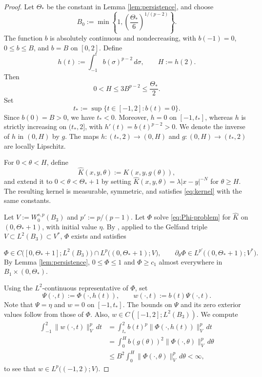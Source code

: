 \documentclass[10pt]{amsart}
\theoremstyle{plain}
\theoremstyle{definition}
\theoremstyle{remark}
\numberwithin{equation}{section}
\begin{document}
\begin{proof}
Let $\Theta_*$ be the constant in Lemma \ref{lem:persistence}, and choose
\[
B_0:=\min\left\{1,\left(\frac{\Theta_*}{6}\right)^{1/(p-2)}\right\}.
\]
The function $b$ is absolutely continuous and nondecreasing, with
$b(-1)=0$, $0\le b\le B$, and $b=B$ on $[0,2]$. Define
\begin{equation}\label{eq:bump-clock}
h(t):=\int_{-1}^t b(\sigma)^{p-2}\,d\sigma,
\qquad H:=h(2).
\end{equation}
Then
\begin{equation}\label{eq:bump-clock-bound}
0<H\le3B^{p-2}\le\frac{\Theta_*}{2}.
\end{equation}
Set
\[
t_*:=\sup\{t\in[-1,2]:b(t)=0\}.
\]
Since $b(0)=B>0$, we have $t_*<0$. Moreover, $h=0$ on
$[-1,t_*]$, whereas $h$ is strictly increasing on $(t_*,2]$, with
$h'(t)=b(t)^{p-2}>0$. We denote the inverse of $h$ in $(0,H)$ by $g$.
The maps $h:(t_*,2)\to(0,H)$ and
$g:(0,H)\to(t_*,2)$ are locally Lipschitz.

For $0<\theta<H$, define
\[
\widehat K(x,y,\theta):=K(x,y,g(\theta)),
\]
and extend it to $0<\theta<\Theta_*+1$ by setting
$\widehat K(x,y,\theta)=\lambda|x-y|^{-N}$ for $\theta\ge H$.
The resulting kernel is measurable, symmetric, and satisfies
\eqref{eq:kernel} with the same constants. 

Let $V:=W^{s,p}_0(B_3)$ and $p':=p/(p-1)$. Let $\Phi$ solve
\eqref{eq:Phi-problem} for $\widehat K$ on $(0,\Theta_*+1)$, with
initial value $\eta$. By \cite[Theorem~1.3 and
Proposition~2.23(ii)]{KaltenbachRuzicka}, applied to the Gelfand triple
$V\subset L^2(B_3)\subset V^*$, $\Phi$ exists and satisfies

\[
\Phi\in C\bigl([0,\Theta_*+1];L^2(B_3)\bigr)
\cap L^p\bigl((0,\Theta_*+1);V\bigr),
\qquad
\partial_\theta\Phi\in L^{p'}\bigl((0,\Theta_*+1);V^*\bigr).
\]
By Lemma \ref{lem:persistence}, $0\le\Phi\le1$ and
$\Phi\ge c_1$ almost everywhere in $B_1\times(0,\Theta_*)$.

Using the $L^2$-continuous representative of $\Phi$, set
\[
\Psi(\cdot,t):=\Phi(\cdot,h(t)),
\qquad w(\cdot,t):=b(t)\Psi(\cdot,t).
\]
Note that $\Psi=\eta$ and $w=0$ on $[-1,t_*]$. The bounds on
$\Psi$ and its zero exterior values follow from those of $\Phi$.
Also, $w\in C([-1,2];L^2(B_3))$. We compute
\begin{align*}
\int_{-1}^2\|w(\cdot,t)\|_V^p\,dt
&=\int_{t_*}^2 b(t)^p\|\Phi(\cdot,h(t))\|_V^p\,dt\\
&=\int_0^H b(g(\theta))^2\|\Phi(\cdot,\theta)\|_V^p\,d\theta\\
&\le B^2\int_0^H\|\Phi(\cdot,\theta)\|_V^p\,d\theta<\infty,
\end{align*}
to see that $w \in L^p\bigl((-1,2);V\bigr)$. 


\end{proof}
\end{document}
